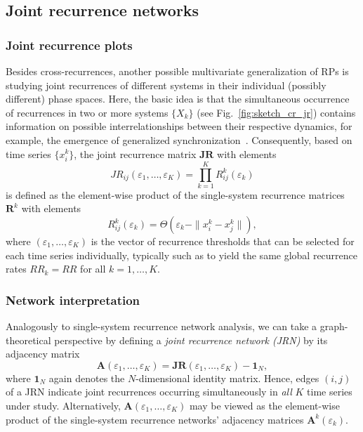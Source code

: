 	\subsection{Joint recurrence networks}
      
		\subsubsection{Joint recurrence plots}

Besides cross-recurrences, another possible multivariate generalization of RPs is studying joint recurrences of different systems in their individual (possibly different) phase spaces. Here, the basic idea is that the simultaneous occurrence of recurrences in two or more systems $\{X_k\}$ (see Fig.~\ref{fig:sketch_cr_jr}) contains information on possible interrelationships between their respective dynamics, for example, the emergence of generalized synchronization~\cite{romano2004,romano2005}. Consequently, based on time series $\{x_i^k\}$, the joint recurrence matrix $\mathbf{JR}$ with elements
\begin{equation}
JR_{ij}(\varepsilon_1,\dots,\varepsilon_K)=\prod_{k=1}^K R_{ij}^k(\varepsilon_k)
\end{equation}
is defined as the element-wise product of the single-system recurrence matrices $\mathbf{R}^k$ with elements
\begin{equation}
R_{ij}^k(\varepsilon_k)=\Theta(\varepsilon_k - \|x_i^k - x_j^k\|), 
\end{equation}
where $(\varepsilon_1,\dots,\varepsilon_K)$ is the vector of recurrence thresholds that can be selected for each time series individually, typically such as to yield the same global recurrence rates $RR_k=RR$ for all $k=1,\dots,K$.


\subsubsection{Network interpretation}

Analogously to single-system recurrence network analysis, we can take a graph-theoretical perspective by defining a \emph{joint recurrence network (JRN)} by its adjacency matrix
\begin{equation}
\mathbf{A}(\varepsilon_1,\dots,\varepsilon_K) = \mathbf{JR}(\varepsilon_1,\dots,\varepsilon_K) - \mathbf{1}_N,
\end{equation}
where $\mathbf{1}_N$ again denotes the $N$-dimensional identity matrix. Hence, edges $(i,j)$ of a JRN indicate joint recurrences occurring simultaneously in \emph{all} $K$ time series under study. Alternatively, $\mathbf{A}(\varepsilon_1,\dots,\varepsilon_K)$ may be viewed as the element-wise product of the single-system recurrence networks' adjacency matrices $\mathbf{A}^k(\varepsilon_k)$.

